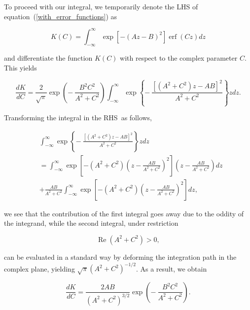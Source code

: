 \documentclass[draft]{agujournal2019}
\begin{document}
{To proceed with our integral, 
we temporarily denote the LHS of equation~(\ref{with_error_functions}) as
\begin{linenomath*}
\begin{equation}
K(C)=\int_{-\infty}^{\infty}\exp\left[  -\left(  Az-B\right)  ^{2}\right]
\operatorname{erf}\left(  Cz\right)  dz 
\label{K(C)}
\end{equation}
\end{linenomath*}
and differentiate the function $K(C)$ with respect to the complex parameter $C$. This yields
\begin{linenomath*}
\[
\frac{dK}{dC}=\frac{2}{\sqrt{\pi}}\exp\left(  -\ \frac{B^{2}C^{2}}{A^{2}%
+C^{2}}\right)  \int_{-\infty}^{\infty}\exp\left\{  -\ \frac{\left[  \left(
A^{2}+C^{2}\right)  z-AB\right]  ^{2}}{A^{2}+C^{2}}\right\}  zdz.
\]
\end{linenomath*}
Transforming the integral in the RHS\ as follows,
\begin{linenomath*}
\begin{align}
&  \int_{-\infty}^{\infty}\exp\left\{  -\ \frac{\left[  \left(  A^{2}%
+C^{2}\right)  z-AB\right]  ^{2}}{A^{2}+C^{2}}\right\}  zdz\nonumber\\
&  =\int_{-\infty}^{\infty}\exp\left[  -\left(  A^{2}+C^{2}\right)  \left(
z-\frac{AB}{A^{2}+C^{2}}\right)  ^{2}\right]  \left(  z-\frac{AB}{A^{2}+C^{2}%
}\right)  dz\nonumber\\
&  +\frac{AB}{A^{2}+C^{2}}\int_{-\infty}^{\infty}\exp\left[  -\left(
A^{2}+C^{2}\right)  \left(  z-\frac{AB}{A^{2}+C^{2}}\right)  ^{2}\right]  dz,
\label{Transform}
\end{align}
\end{linenomath*}
we see that the contribution of the first integral goes away due to the oddity of the
integrand, while the second integral, under restriction
\begin{linenomath*}
\begin{equation}
\operatorname{Re}\left(  A^{2}+C^{2}\right)  > 0, 
\label{Re(A^2+C^2)>0}
\end{equation}
\end{linenomath*}
can be evaluated in a standard way by deforming the integration path in the
complex plane, yielding $\sqrt{\pi}\left(  A^{2}+C^{2}\right)  ^{-1/2}$.
As a result, we obtain
\begin{linenomath*}
\begin{equation}
\frac{dK}{dC}=\frac{2AB}{\left(  A^{2}+C^{2}\right)  ^{3/2}}\exp\left(
-\ \frac{B^{2}C^{2}}{A^{2}+C^{2}}\right)  . 
\label{dK/dC}
\end{equation}

\end{linenomath*}}
\end{document}
